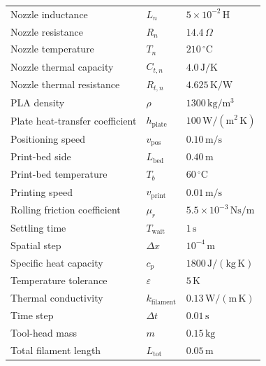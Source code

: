 \documentclass[11pt,a4paper]{article}
\begin{document}
\begin{longtable}{lll}
Nozzle inductance
& \(L_n\)
& \(5\times10^{-2}\,\mathrm{H}\) \\

Nozzle resistance
& \(R_n\)
& \(14.4\,\Omega\) \\

Nozzle temperature
& \(T_n\)
& \(210\,^\circ\mathrm{C}\) \\

Nozzle thermal capacity
& \(C_{t,n}\)
& \(4.0\,\mathrm{J/K}\) \\

Nozzle thermal resistance
& \(R_{t,n}\)
& \(4.625\,\mathrm{K/W}\) \\

PLA density
& \(\rho\)
& \(1300\,\mathrm{kg/m^3}\) \\

Plate heat-transfer coefficient
& \(h_{\mathrm{plate}}\)
& \(100\,\mathrm{W/(m^2\,K)}\) \\

Positioning speed
& \(v_{\mathrm{pos}}\)
& \(0.10\,\mathrm{m/s}\) \\

Print-bed side
& \(L_{\mathrm{bed}}\)
& \(0.40\,\mathrm{m}\) \\

Print-bed temperature
& \(T_b\)
& \(60\,^\circ\mathrm{C}\) \\

Printing speed
& \(v_{\mathrm{print}}\)
& \(0.01\,\mathrm{m/s}\) \\

Rolling friction coefficient
& \(\mu_r\)
& \(5.5\times10^{-3}\,\mathrm{Ns/m}\) \\

Settling time
& \(T_{\mathrm{wait}}\)
& \(1\,\mathrm{s}\) \\

Spatial step
& \(\Delta x\)
& \(10^{-4}\,\mathrm{m}\) \\

Specific heat capacity
& \(c_p\)
& \(1800\,\mathrm{J/(kg\,K)}\) \\

Temperature tolerance
& \(\varepsilon\)
& \(5\,\mathrm{K}\) \\

Thermal conductivity
& \(k_{\mathrm{filament}}\)
& \(0.13\,\mathrm{W/(m\,K)}\) \\

Time step
& \(\Delta t\)
& \(0.01\,\mathrm{s}\) \\

Tool-head mass
& \(m\)
& \(0.15\,\mathrm{kg}\) \\

Total filament length
& \(L_{\mathrm{tot}}\)
& \(0.05\,\mathrm{m}\) \\

\hline
\end{longtable}
\end{document}
